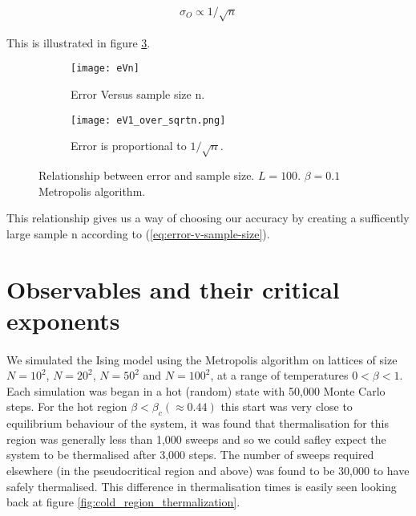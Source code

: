 \documentclass[12pt] {report} %
\begin{document}
		\begin{align}
			\sigma_O \propto 1/\sqrt{n}		\label{eq:error-v-sample-size}
		\end{align} 
		
		This is illustrated in figure \ref{fig:error_V_sample_size}.
			
			\begin{figure}[H]
				\centering
				\begin{subfigure}[h]{0.49\textwidth}
					\centering
					\texttt{[image: eVn]}
					\caption{Error Versus sample size n.}
					\label{fig:eVn}
				\end{subfigure}
				\hfill
				\begin{subfigure}[h]{0.49\textwidth}
					\centering
					\texttt{[image: eV1\_over\_sqrtn.png]}
					\caption{Error is proportional to $1/\sqrt{n}$.}
					\label{fig:eV1_over_sqrt(n)}
				\end{subfigure} 
				\caption{Relationship between error and sample size. $L=100$. $\beta = 0.1$ Metropolis algorithm.}
				\label{fig:error_V_sample_size}
			\end{figure}
			
			This relationship gives us a way of choosing our accuracy by creating a sufficently large sample n according to (\ref{eq:error-v-sample-size}).

		\section{Observables and their critical exponents}	\label{sec:observables}
		
			\paragraph{}
				We simulated the Ising model using the Metropolis algorithm on lattices of size $N = 10^2$, $N = 20^2$, $N = 50^2$ and $N = 100^2$, at a range of temperatures $0 < \beta < 1$. Each simulation was began in a hot (random) state with 50,000 Monte Carlo steps. For the hot region $\beta < \beta_c (\approx 0.44)$ this start was very close to equilibrium behaviour of the system, it was found that thermalisation for this region was generally less than 1,000 sweeps and so we could safley expect the system to be thermalised after 3,000 steps. The number of sweeps required elsewhere (in the pseudocritical region and above) was found to be 30,000 to have safely thermalised. This difference in thermalisation times is easily seen looking back at figure \ref{fig:cold_region_thermalization}.
				
\end{document}
